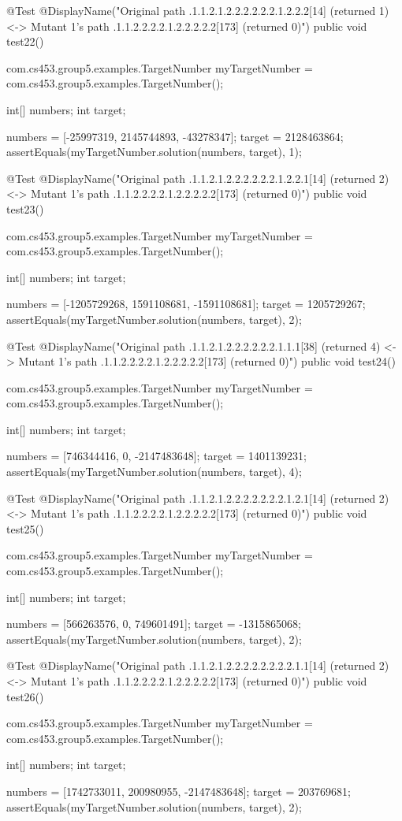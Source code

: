 @Test
@DisplayName("Original path .1.1.2.1.2.2.2.2.2.2.1.2.2.2[14] (returned 1) <-> Mutant 1's path .1.1.2.2.2.2.1.2.2.2.2.2[173] (returned 0)")
public void test22() {
    com.cs453.group5.examples.TargetNumber myTargetNumber = com.cs453.group5.examples.TargetNumber();

    int[] numbers;
    int target;

    numbers = [-25997319, 2145744893, -43278347];
    target = 2128463864;
    assertEquals(myTargetNumber.solution(numbers, target), 1);
}

@Test
@DisplayName("Original path .1.1.2.1.2.2.2.2.2.2.1.2.2.1[14] (returned 2) <-> Mutant 1's path .1.1.2.2.2.2.1.2.2.2.2.2[173] (returned 0)")
public void test23() {
    com.cs453.group5.examples.TargetNumber myTargetNumber = com.cs453.group5.examples.TargetNumber();

    int[] numbers;
    int target;

    numbers = [-1205729268, 1591108681, -1591108681];
    target = 1205729267;
    assertEquals(myTargetNumber.solution(numbers, target), 2);
}

@Test
@DisplayName("Original path .1.1.2.1.2.2.2.2.2.2.1.1.1[38] (returned 4) <-> Mutant 1's path .1.1.2.2.2.2.1.2.2.2.2.2[173] (returned 0)")
public void test24() {
    com.cs453.group5.examples.TargetNumber myTargetNumber = com.cs453.group5.examples.TargetNumber();

    int[] numbers;
    int target;

    numbers = [746344416, 0, -2147483648];
    target = 1401139231;
    assertEquals(myTargetNumber.solution(numbers, target), 4);
}

@Test
@DisplayName("Original path .1.1.2.1.2.2.2.2.2.2.2.1.2.1[14] (returned 2) <-> Mutant 1's path .1.1.2.2.2.2.1.2.2.2.2.2[173] (returned 0)")
public void test25() {
    com.cs453.group5.examples.TargetNumber myTargetNumber = com.cs453.group5.examples.TargetNumber();

    int[] numbers;
    int target;

    numbers = [566263576, 0, 749601491];
    target = -1315865068;
    assertEquals(myTargetNumber.solution(numbers, target), 2);
}

@Test
@DisplayName("Original path .1.1.2.1.2.2.2.2.2.2.2.2.1.1[14] (returned 2) <-> Mutant 1's path .1.1.2.2.2.2.1.2.2.2.2.2[173] (returned 0)")
public void test26() {
    com.cs453.group5.examples.TargetNumber myTargetNumber = com.cs453.group5.examples.TargetNumber();

    int[] numbers;
    int target;

    numbers = [1742733011, 200980955, -2147483648];
    target = 203769681;
    assertEquals(myTargetNumber.solution(numbers, target), 2);
}

